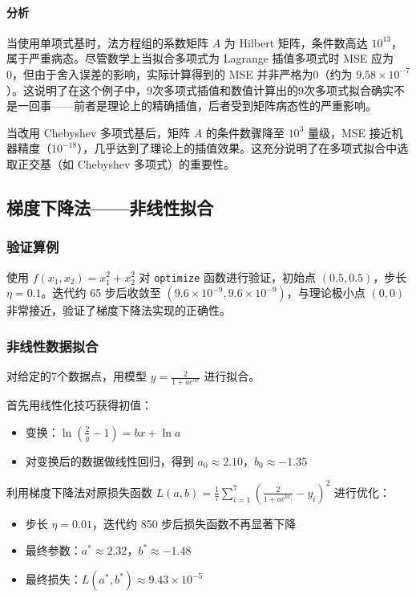 \documentclass{article}
\begin{document}
\paragraph{分析} 当使用单项式基时，法方程组的系数矩阵 $A$ 为 Hilbert 矩阵，条件数高达 $10^{13}$，属于严重病态。尽管数学上当拟合多项式为 Lagrange 插值多项式时 MSE 应为0，但由于舍入误差的影响，实际计算得到的 MSE 并非严格为0（约为 $9.58 \times 10^{-7}$）。这说明了在这个例子中，9次多项式插值和数值计算出的9次多项式拟合确实不是一回事——前者是理论上的精确插值，后者受到矩阵病态性的严重影响。

当改用 Chebyshev 多项式基后，矩阵 $A$ 的条件数骤降至 $10^3$ 量级，MSE 接近机器精度（$10^{-18}$），几乎达到了理论上的插值效果。这充分说明了在多项式拟合中选取正交基（如 Chebyshev 多项式）的重要性。

\subsection{梯度下降法——非线性拟合}

\subsubsection{验证算例}

使用 $f(x_1, x_2) = x_1^2 + x_2^2$ 对 \texttt{optimize} 函数进行验证，初始点 $(0.5, 0.5)$，步长 $\eta = 0.1$。迭代约 65 步后收敛至 $(9.6 \times 10^{-9}, 9.6 \times 10^{-9})$，与理论极小点 $(0, 0)$ 非常接近，验证了梯度下降法实现的正确性。

\subsubsection{非线性数据拟合}

对给定的7个数据点，用模型 $y = \frac{2}{1 + a e^{bx}}$ 进行拟合。

首先用线性化技巧获得初值：
\begin{itemize}
    \item 变换：$\ln\left(\frac{2}{y} - 1\right) = bx + \ln a$
    \item 对变换后的数据做线性回归，得到 $a_0 \approx 2.10$，$b_0 \approx -1.35$
\end{itemize}

利用梯度下降法对原损失函数 $L(a,b) = \frac{1}{7}\sum_{i=1}^{7} \left( \frac{2}{1 + a e^{bx_i}} - y_i \right)^2$ 进行优化：
\begin{itemize}
    \item 步长 $\eta = 0.01$，迭代约 850 步后损失函数不再显著下降
    \item 最终参数：$a^* \approx 2.32$，$b^* \approx -1.48$
    \item 最终损失：$L(a^*, b^*) \approx 9.43 \times 10^{-5}$
\end{itemize}
\end{document}
